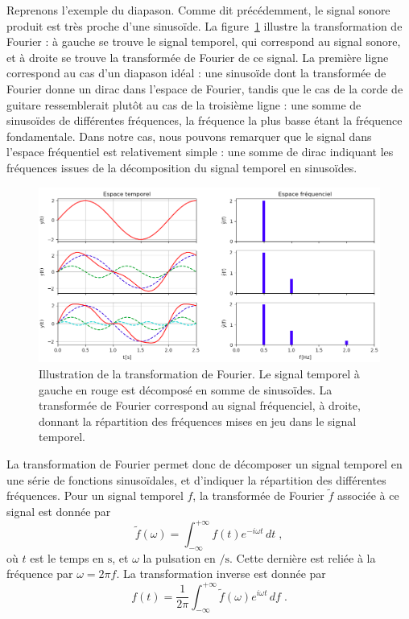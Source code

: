 \documentclass[11pt, twoside, a4paper, openright]{report}
\begin{document}
Reprenons l'exemple du diapason. Comme dit précédemment, le signal sonore produit est très proche d'une sinusoïde. La figure~\ref{fig:example_tf} illustre la transformation de Fourier : à gauche se trouve le signal temporel, qui correspond au signal sonore, et à droite se trouve la transformée de Fourier de ce signal.
La première ligne correspond au cas d'un diapason idéal :
une sinusoïde dont la transformée de Fourier donne un dirac dans l'espace de Fourier, tandis que le cas de la corde de guitare ressemblerait plutôt au cas de la troisième ligne :
une somme de sinusoïdes de différentes fréquences, la fréquence la plus basse étant la fréquence fondamentale. Dans notre cas, nous pouvons remarquer que le signal dans l'espace fréquentiel est relativement simple : une somme de dirac indiquant les fréquences issues de la décomposition du signal temporel en sinusoïdes.
\begin{figure}[h]
  \centering
  \includegraphics[scale=0.5]{example_tf}
  \caption{Illustration de la transformation de Fourier. Le signal temporel à gauche en rouge est décomposé en somme de sinusoïdes. La transformée de Fourier correspond au signal fréquenciel, à droite, donnant la répartition des fréquences mises en jeu dans le signal temporel.}
  \label{fig:example_tf}
\end{figure}

La transformation de Fourier permet donc de décomposer un signal temporel en une série de fonctions sinusoïdales, et d'indiquer la répartition des différentes fréquences. Pour un signal temporel $f$, la transformée de Fourier $\tilde f$ associée à ce signal est donnée par
\begin{equation}
  \label{eq:def_tf}
  \tilde f(\omega) = \int_{-\infty}^{+\infty}f(t) e^{- i \omega t} \,dt  \; ,
\end{equation}
où $t$ est le temps en $\si{\second}$, et $\omega$ la pulsation en $\si{\per\second}$. Cette dernière est reliée à la fréquence par $\omega = 2 \pi f$. La transformation inverse est donnée par
\begin{equation}
  \label{eq:def_tf_inv}
   f(t) = \frac{1}{2 \pi}\int_{-\infty}^{+\infty} \tilde f(\omega) e^{ i \omega t} \,df  \; .
\end{equation}
\end{document}
